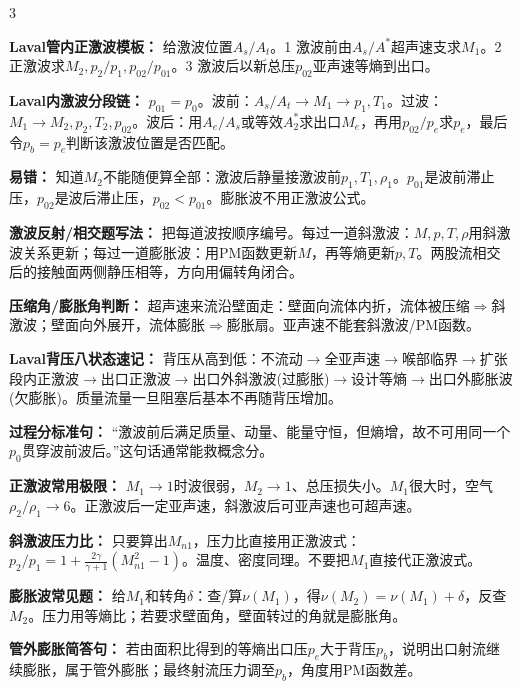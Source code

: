 \documentclass[a4paper]{article}
\newcommand{\sect}[1]{\par{\bfseries\color{Q}#1：}}
\begin{document}
\begin{multicols}{3}
{\sect{Laval管内正激波模板}
给激波位置$A_s/A_t$。1 激波前由$A_s/A^*$超声速支求$M_1$。2 正激波求$M_2,p_2/p_1,p_{02}/p_{01}$。3 激波后以新总压$p_{02}$亚声速等熵到出口。
\sect{Laval内激波分段链}
$p_{01}=p_0$。波前：$A_s/A_t\to M_1\to p_1,T_1$。过波：$M_1\to M_2,p_2,T_2,p_{02}$。波后：用$A_e/A_s$或等效$A^*_2$求出口$M_e$，再用$p_{02}/p_e$求$p_e$，最后令$p_b=p_e$判断该激波位置是否匹配。

\sect{易错}
知道$M_2$不能随便算全部：激波后静量接激波前$p_1,T_1,\rho_1$。$p_{01}$是波前滞止压，$p_{02}$是波后滞止压，$p_{02}<p_{01}$。膨胀波不用正激波公式。
\sect{激波反射/相交题写法}
把每道波按顺序编号。每过一道斜激波：$M,p,T,\rho$用斜激波关系更新；每过一道膨胀波：用PM函数更新$M$，再等熵更新$p,T$。两股流相交后的接触面两侧静压相等，方向用偏转角闭合。
\sect{压缩角/膨胀角判断}
超声速来流沿壁面走：壁面向流体内折，流体被压缩$\Rightarrow$斜激波；壁面向外展开，流体膨胀$\Rightarrow$膨胀扇。亚声速不能套斜激波/PM函数。
\sect{Laval背压八状态速记}
背压从高到低：不流动$\to$全亚声速$\to$喉部临界$\to$扩张段内正激波$\to$出口正激波$\to$出口外斜激波(过膨胀)$\to$设计等熵$\to$出口外膨胀波(欠膨胀)。质量流量一旦阻塞后基本不再随背压增加。
\sect{过程分标准句}
“激波前后满足质量、动量、能量守恒，但熵增，故不可用同一个$p_0$贯穿波前波后。”这句话通常能救概念分。
\sect{正激波常用极限}
$M_1\to1$时波很弱，$M_2\to1$、总压损失小。$M_1$很大时，空气$\rho_2/\rho_1\to6$。正激波后一定亚声速，斜激波后可亚声速也可超声速。
\sect{斜激波压力比}
只要算出$M_{n1}$，压力比直接用正激波式：$p_2/p_1=1+\frac{2\gamma}{\gamma+1}(M_{n1}^2-1)$。温度、密度同理。不要把$M_1$直接代正激波式。
\sect{膨胀波常见题}
给$M_1$和转角$\delta$：查/算$\nu(M_1)$，得$\nu(M_2)=\nu(M_1)+\delta$，反查$M_2$。压力用等熵比；若要求壁面角，壁面转过的角就是膨胀角。
\sect{管外膨胀简答句}
若由面积比得到的等熵出口压$p_e$大于背压$p_b$，说明出口射流继续膨胀，属于管外膨胀；最终射流压力调至$p_b$，角度用PM函数差。
}


\end{multicols}
\end{document}
